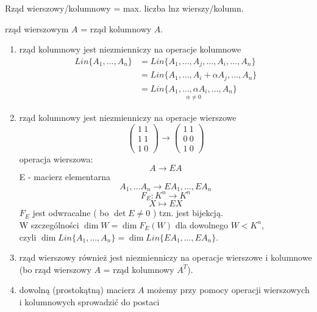 \begin{uw}
    Rząd wierszowy/kolumnowy = max. liczba lnz wierszy/kolumn.
\end{uw}

\begin{tw} 
    rząd wierszowym $A$ = rząd kolumnowy $A$.
\end{tw}

\begin{dd} \hfill
    \begin{enumerate}[{(}1{)}]
        \item rząd kolumnowy jest niezmienniczy na operacje kolumnowe
        \begin{align*}
            Lin\{A_1,\dots,A_n\} & = Lin\{A_1,\dots,A_j,\dots,A_i,\dots,A_n\} \\
            & = Lin \{A_1, \dots,A_i + \alpha A_j, \dots, A_n\} \\
            & = \underset{\alpha \neq 0}{Lin \{A_1, \dots, \alpha A_i, \dots, A_n \}}
        \end{align*}
        \item rząd kolumnowy jest niezmienniczy na operacje wierszowe
        $$
        \begin{pmatrix}
            1 \ 1 \\ 
            1 \ 1 \\ 
            1 \ 0 
        \end{pmatrix}
            \rightarrow
        \begin{pmatrix}
            1 \ 1 \\ 
            0 \ 0 \\ 
            1 \ 0
        \end{pmatrix}
        $$
        operacja wierszowa: $$ A \rightarrow EA $$ E - macierz elementarna
        $$A_1, \dots A_n \rightarrow EA_1,\dots,EA_n$$ 
        $$ F_E : K^n \rightarrow K^n $$
        $$ X \mapsto EX $$
        $F_E$ jest odwracalne ( bo $\det E \neq 0$ ) tzn. jest bijekcją. \\
        W szczególności $\dim W = \dim F_E (W)$ dla dowolnego $ W < K^n$, \\ 
        czyli $\dim Lin \{A_1,\dots,A_n\} = \dim Lin \{EA_1,\dots,EA_n\}$.
        \item rząd wierszowy również jest niezmienniczy na operacje wierszowe i kolumnowe (bo rząd wierszowy $A$ = rząd kolumnowy $A^T$).
        \item dowolną (prostokątną) macierz $A$ możemy przy pomocy operacji wierszowych i kolumnowych sprowadzić do postaci $$
$$
\end{enumerate}
\end{dd}
